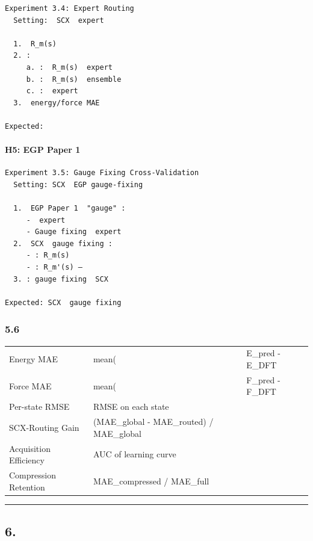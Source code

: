 \documentclass[
  12pt,
]{article}
\begin{document}
\begin{verbatim}
Experiment 3.4: Expert Routing
  Setting:  SCX  expert

  1.  R_m(s)
  2. :
     a. :  R_m(s)  expert
     b. :  R_m(s)  ensemble
     c. :  expert 
  3.  energy/force MAE

Expected: 
\end{verbatim}

\paragraph{H5:  EGP Paper 1}\label{h5-ux8fdeux63a5-egp-paper-1}

\begin{verbatim}
Experiment 3.5: Gauge Fixing Cross-Validation
  Setting: SCX  EGP gauge-fixing 

  1.  EGP Paper 1  "gauge" :
     -  expert 
     - Gauge fixing  expert
  2.  SCX  gauge fixing :
     - : R_m(s) 
     - : R_m'(s) — 
  3. : gauge fixing  SCX 

Expected: SCX  gauge fixing 
\end{verbatim}

\subsubsection{5.6 }\label{ux8bc4ux4f30ux6307ux6807-1}

\begin{longtable}[]{@{}lll@{}}
\toprule\noalign{}
 &  &  \\
\midrule\noalign{}
\endhead
\bottomrule\noalign{}
\endlastfoot
Energy MAE & mean( & E\_pred - E\_DFT \\
Force MAE & mean( & F\_pred - F\_DFT \\
Per-state RMSE & RMSE on each state &  \\
SCX-Routing Gain & (MAE\_global - MAE\_routed) / MAE\_global &
 \\
Acquisition Efficiency & AUC of learning curve &  \\
Compression Retention & MAE\_compressed / MAE\_full &  \\
\end{longtable}

\begin{center}\rule{0.5\linewidth}{0.5pt}\end{center}

\subsection{6. }\label{ux4f9dux8d56ux4e0eux73afux5883}
\end{document}

